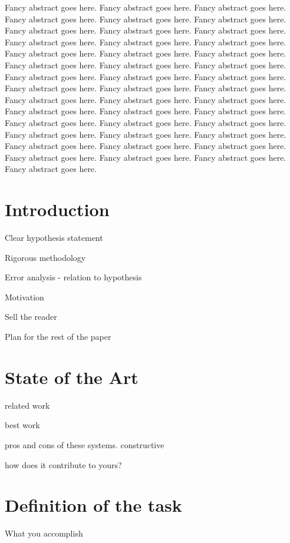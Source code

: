 \documentclass[a4paper,]{report}
\begin{document}
Fancy abstract goes here. Fancy abstract goes here. Fancy abstract goes
here. Fancy abstract goes here. Fancy abstract goes here. Fancy abstract
goes here. Fancy abstract goes here. Fancy abstract goes here. Fancy
abstract goes here. Fancy abstract goes here. Fancy abstract goes here.
Fancy abstract goes here. Fancy abstract goes here. Fancy abstract goes
here. Fancy abstract goes here. Fancy abstract goes here. Fancy abstract
goes here. Fancy abstract goes here. Fancy abstract goes here. Fancy
abstract goes here. Fancy abstract goes here. Fancy abstract goes here.
Fancy abstract goes here. Fancy abstract goes here. Fancy abstract goes
here. Fancy abstract goes here. Fancy abstract goes here. Fancy abstract
goes here. Fancy abstract goes here. Fancy abstract goes here. Fancy
abstract goes here. Fancy abstract goes here. Fancy abstract goes here.
Fancy abstract goes here. Fancy abstract goes here. Fancy abstract goes
here. Fancy abstract goes here. Fancy abstract goes here. Fancy abstract
goes here. Fancy abstract goes here. Fancy abstract goes here. Fancy
abstract goes here. Fancy abstract goes here.

\chapter{Introduction}\label{sec:introduction}

Clear hypothesis statement

Rigorous methodology

Error analysis - relation to hypothesis

Motivation

Sell the reader

Plan for the rest of the paper

\chapter{State of the Art}\label{sec:state-of-the-art}

related work

best work

pros and cons of these systems. constructive

how does it contribute to yours?

\chapter{Definition of the task}\label{sec:definition-of-the-task}

What you accomplish
\end{document}
